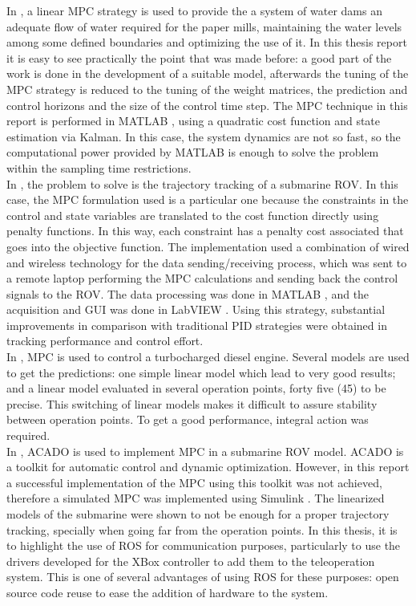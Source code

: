 In \cite{Gabrielsson2012}, a linear MPC strategy is used to provide the a system of water dams an adequate flow of water required for the paper mills, maintaining the water levels among some defined boundaries and optimizing the use of it. In this thesis report it is easy to see practically the point that was made before: a good part of the work is done in the development of a suitable model, afterwards the tuning of the MPC strategy is reduced to the tuning of the weight matrices, the prediction and control horizons and the size of the control time step. The MPC technique in this report is performed in MATLAB \textsuperscript{\textregistered}, using a quadratic cost function and state estimation via Kalman. In this case, the system dynamics are not so fast, so the computational power provided by MATLAB \textsuperscript{\textregistered} is enough to solve the problem within the sampling time restrictions.\\

In \cite{Molero2011}, the problem to solve is the trajectory tracking of a submarine ROV. In this case, the MPC formulation used is a particular one because the constraints in the control and state variables are translated to the cost function directly using penalty functions. In this way, each constraint has a penalty cost associated that goes into the objective function. The implementation used a combination of wired and wireless technology for the data sending/receiving process, which was sent to a remote laptop performing the MPC calculations and sending back the control signals to the ROV. The data processing was done in MATLAB \textsuperscript{\textregistered}, and the acquisition and GUI was done in LabVIEW \texttrademark. Using this strategy, substantial improvements in comparison with traditional PID strategies were obtained in tracking performance and control effort.\\

In \cite{Kristoffersson2006}, MPC is used to control a turbocharged diesel engine. Several models are used to get the predictions: one simple linear model which lead to very good results; and a linear model evaluated in several operation points, forty five (45) to be precise. This switching of linear models makes it difficult to assure stability between operation points. To get a good performance, integral action was required.\\

In \cite{Johansson2012}, ACADO is used to implement MPC in a submarine ROV model. ACADO is a toolkit for automatic control and dynamic optimization. However, in this report a successful implementation of the MPC using this toolkit was not achieved, therefore a simulated MPC was implemented using Simulink \textsuperscript{\textregistered}. The linearized models of the submarine were shown to not be enough for a proper trajectory tracking, specially when going far from the operation points. In this thesis, it is to highlight the use of ROS for communication purposes, particularly to use the drivers developed for the XBox controller to add them to the teleoperation system. This is one of several advantages of using ROS for these purposes: open source code reuse to ease the addition of hardware to the system.\\

